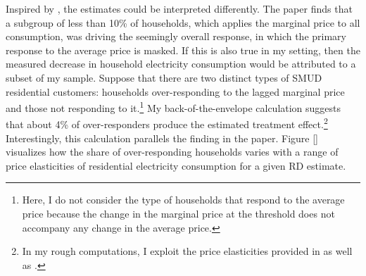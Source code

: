 Inspired by \cite{Misunderstanding-Nonlinear-Prices_2020_(Shaffer)}, the estimates could be interpreted differently. The paper finds that a subgroup of less than 10\% of households, which applies the marginal price to all consumption, was driving the seemingly overall response, in which the primary response to the average price is masked. If this is also true in my setting, then the measured decrease in household electricity consumption would be attributed to a subset of my sample. Suppose that there are two distinct types of SMUD residential customers: households over-responding to the lagged marginal price and those not responding to it.\footnote{Here, I do not consider the type of households that respond to the average price because the change in the marginal price at the threshold does not accompany any change in the average price.} My back-of-the-envelope calculation suggests that about 4\% of over-responders produce the estimated treatment effect.\footnote{In my rough computations, I exploit the price elasticities provided in \cite{Do-Consumers-Respond-to-Marginal-or-Average-Price?-Evidence-from-Nonlinear-Electricity-Pricing_2014_(Ito)} as well as \cite{SmartPricing-Options-Final-Evaluation_SMUD_2014}.} Interestingly, this calculation parallels the finding in the paper. Figure \ref{} visualizes how the share of over-responding households varies with a range of price elasticities of residential electricity consumption for a given RD estimate. 
